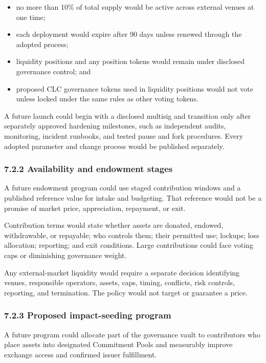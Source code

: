 \documentclass[11pt]{article}
\begin{document}
\begin{itemize}[leftmargin=*]
\item no more than 10\% of total supply would be active across external venues at one time;
\item each deployment would expire after 90 days unless renewed through the adopted process;
\item liquidity positions and any position tokens would remain under disclosed governance control; and
\item proposed CLC governance tokens used in liquidity positions would not vote unless locked under the same rules as other voting tokens.
\end{itemize}
A future launch could begin with a disclosed multisig and transition only after separately approved hardening milestones, such as independent audits, monitoring, incident runbooks, and tested pause and fork procedures. Every adopted parameter and change process would be published separately.

\subsubsection*{7.2.2 Availability and endowment stages}

A future endowment program could use staged contribution windows and a published reference value for intake and budgeting. That reference would not be a promise of market price, appreciation, repayment, or exit.

Contribution terms would state whether assets are donated, endowed, withdrawable, or repayable; who controls them; their permitted use; lockups; loss allocation; reporting; and exit conditions. Large contributions could face voting caps or diminishing governance weight.

Any external-market liquidity would require a separate decision identifying venues, responsible operators, assets, caps, timing, conflicts, risk controls, reporting, and termination. The policy would not target or guarantee a price.

\subsubsection*{7.2.3 Proposed impact-seeding program}

A future program could allocate part of the governance vault to contributors who place assets into designated Commitment Pools and measurably improve exchange access and confirmed issuer fulfillment.
\end{document}
